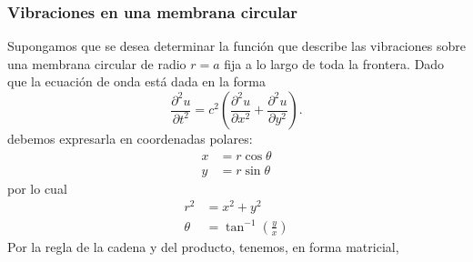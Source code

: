 \documentclass[11pt,letterpaper,draft]{report}
\newcommand\<{\langle}
\renewcommand\>{\rangle}
\begin{document}
\subsubsection{Vibraciones en una membrana circular}
Supongamos que se desea determinar la función que describe las
vibraciones sobre una membrana circular de radio $r=a$ fija a lo largo
de toda la frontera.
Dado que la ecuación de onda está dada en la forma
\[
  \frac{\partial^{2} u}{\partial t^{2}}
  = c^{2} \left(
    \frac{\partial ^{2}u}{\partial x^{2}}
    +\frac{\partial ^{2}u}{\partial y^{2}}
  \right)
.\]
debemos expresarla en coordenadas polares:
\begin{align*}
  x &= r\cos\theta \\
  y &= r\sin\theta
\end{align*}
por lo cual
\begin{align*}
  r^2 &= x^{2}+y^{2} \\
  \theta &= \tan^{-1}(\tfrac{y}{x})
\end{align*}
Por la regla de la cadena y del producto, tenemos, en forma matricial,
\end{document}
